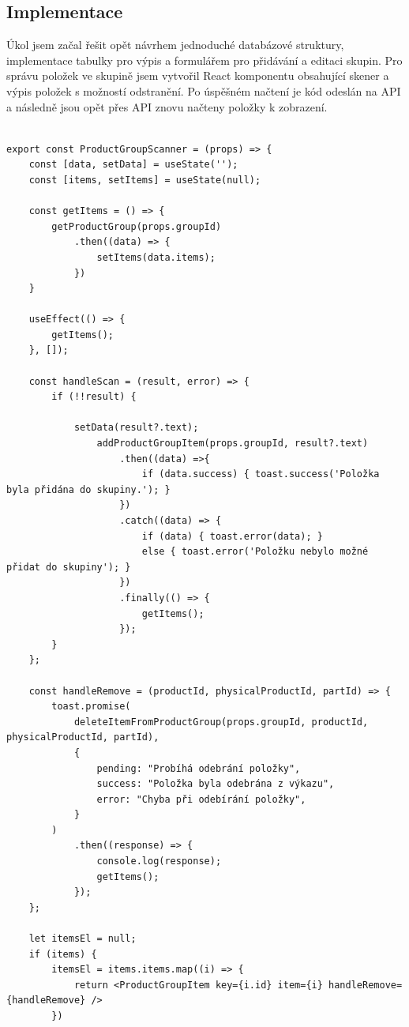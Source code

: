 \subsection{Implementace}

Úkol jsem začal řešit opět návrhem jednoduché databázové struktury, implementace tabulky pro výpis a formulářem pro přidávání a editaci skupin. Pro správu položek ve skupině jsem vytvořil React komponentu obsahující skener a výpis položek s možností odstranění. Po úspěšném načtení je kód odeslán na API a následně jsou opět přes API znovu načteny položky k zobrazení.

\begin{lstlisting}[label=src:ProductGroupScanner.js,caption={React komponenta pro správu a zobrazení položek ve skupině}]

export const ProductGroupScanner = (props) => {
    const [data, setData] = useState('');
    const [items, setItems] = useState(null);

    const getItems = () => {
        getProductGroup(props.groupId)
            .then((data) => {
                setItems(data.items);
            })
    }

    useEffect(() => {
        getItems();
    }, []);

    const handleScan = (result, error) => {
        if (!!result) {

            setData(result?.text);
                addProductGroupItem(props.groupId, result?.text)
                    .then((data) =>{
                        if (data.success) { toast.success('Položka byla přidána do skupiny.'); }
                    })
                    .catch((data) => {
                        if (data) { toast.error(data); }
                        else { toast.error('Položku nebylo možné přidat do skupiny'); }
                    })
                    .finally(() => {
                        getItems();
                    });
        }
    };

    const handleRemove = (productId, physicalProductId, partId) => {
        toast.promise(
            deleteItemFromProductGroup(props.groupId, productId, physicalProductId, partId),
            {
                pending: "Probíhá odebrání položky",
                success: "Položka byla odebrána z výkazu",
                error: "Chyba při odebírání položky",
            }
        )
            .then((response) => {
                console.log(response);
                getItems();
            });
    };

    let itemsEl = null;
    if (items) {
        itemsEl = items.items.map((i) => {
            return <ProductGroupItem key={i.id} item={i} handleRemove={handleRemove} />
        })


\end{lstlisting}
